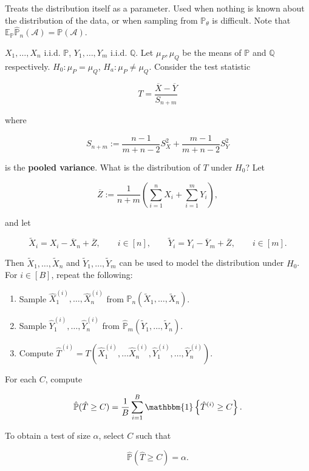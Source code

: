Treats the distribution itself as a parameter. Used when nothing is known about the distribution of the data, or when sampling from \(\mathbb{P}_\theta\) is difficult. Note that \(\mathbb{E}_{\mathbb{P}}  \hat{\mathbb{P}}_n(\mathcal{A})  = \mathbb{P}(\mathcal{A})\).

\begin{example}

\(X_1, \ldots, X_n\) i.i.d. \(\mathbb{P}\), \(Y_1, \ldots, Y_m\) i.i.d. \(\mathbb{Q}\). Let \(\mu_P, \mu_Q\) be the means of \(\mathbb{P}\) and \(\mathbb{Q}\) respectively. \(H_0: \mu_P = \mu_Q\), \(H_a: \mu_P \neq \mu_Q\). Consider the test statistic

\[
T = \frac{\overline{X} - \overline{Y}}{S_{n+m}}
\]

where

\[
S_{n+m} := \frac{n-1}{m+n-2}S_X^2 + \frac{m-1}{m+n-2} S_Y^2
\]

is the \textbf{pooled variance}. What is the distribution of \(T\) under \(H_0\)? Let 

\[
\overline{Z} := \frac{1}{n+m} \left( \sum_{i=1}^n X_i + \sum_{i=1}^m Y_i\right),
\]

and let 

\[
\tilde{X}_i = X_i - \overline{X}_n + \overline{Z}, \qquad i \in [n], \qquad \tilde{Y}_i = Y_i - \overline{Y}_m + \overline{Z}, \qquad i \in [m].
\]

Then \(\tilde{X}_1, \ldots, \tilde{X}_n\) and \(\tilde{Y}_1, \ldots, \tilde{Y}_m\) can be used to model the distribution under \(H_0\). For \(i \in [B]\), repeat the following:

\begin{enumerate}

\item Sample \(\hat{X}_1^{(i)}, \ldots, \hat{X}_n^{(i)}\) from \(\hat{\mathbb{P}}_n(\tilde{X}_1, \ldots, \tilde{X}_n)\). 

\item Sample \(\hat{Y}_1^{(i)}, \ldots, \hat{Y}_n^{(i)}\) from \(\hat{\mathbb{P}}_m(\tilde{Y}_1, \ldots, \tilde{Y}_n)\). 

\item Compute \(\hat{T}^{(i)} = T( \hat{X}_1^{(i)}, \ldots \hat{X}_n^{(i)},  \hat{Y}_1^{(i)}, \ldots, \hat{Y}_n^{(i)})\). 



\end{enumerate}

For each \(C\), compute 

\[
\hat{\mathbb{P}}(\hat{T} \geq C) = \frac{1}{B} \sum_{i=1}^B \mathbbm{1} \left\{ \hat{T}^{(i)} \geq C \right\}.
\]

To obtain a test of size \(\alpha\), select \(C\) such that 

\[
\hat{\mathbb{P}}(\hat{T} \geq C) = \alpha.
\]

\end{example}

